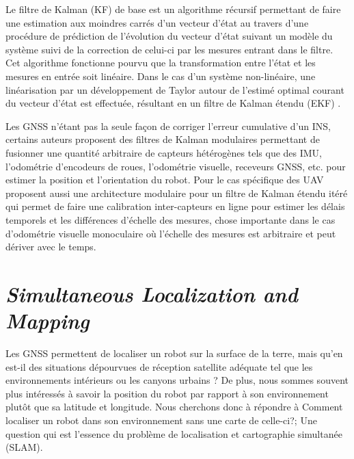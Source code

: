 Le filtre de Kalman (KF) de base est un algorithme récursif permettant de faire une estimation aux moindres carrés d'un vecteur d'état au travers d'une procédure de prédiction de l'évolution du vecteur d'état suivant un modèle du système suivi de la correction de celui-ci par les mesures entrant dans le filtre. Cet algorithme fonctionne pourvu que la transformation entre l'état et les mesures en entrée soit linéaire. Dans le cas d'un système non-linéaire, une linéarisation par un développement de Taylor autour de l'estimé optimal courant du vecteur d'état est effectuée, résultant en un filtre de Kalman étendu (EKF) \citep{Chui2017}.

Les GNSS n'étant pas la seule façon de corriger l'erreur cumulative d'un INS, certains auteurs proposent des filtres de Kalman modulaires permettant de fusionner une quantité arbitraire de capteurs hétérogènes tels que des IMU, l'odométrie d'encodeurs de roues, l'odométrie visuelle, receveurs GNSS, etc. \citep{MooreEkf2014} pour estimer la position et l'orientation du robot. Pour le cas spécifique des UAV \citep{Lynen2013} proposent aussi une architecture modulaire pour un filtre de Kalman étendu itéré qui permet de faire une calibration inter-capteurs en ligne pour estimer les délais temporels et les différences d'échelle des mesures, chose importante dans le cas d'odométrie visuelle monoculaire où l'échelle des mesures est arbitraire et peut dériver avec le temps.

\section{\textit{Simultaneous Localization and Mapping}}\label{subsec:reconstruction}

Les GNSS permettent de localiser un robot sur la surface de la terre, mais qu'en est-il des situations dépourvues de réception satellite adéquate tel que les environnements intérieurs ou les \guillemotleft canyons urbains \guillemotright ? De plus, nous sommes souvent plus intéressés à savoir la position du robot par rapport à son environnement plutôt que sa latitude et longitude. Nous cherchons donc à répondre à \guillemotleft Comment localiser un robot dans son environnement sans une carte de celle-ci?\guillemotright; Une question qui est l'essence du problème de localisation et cartographie simultanée (SLAM).

